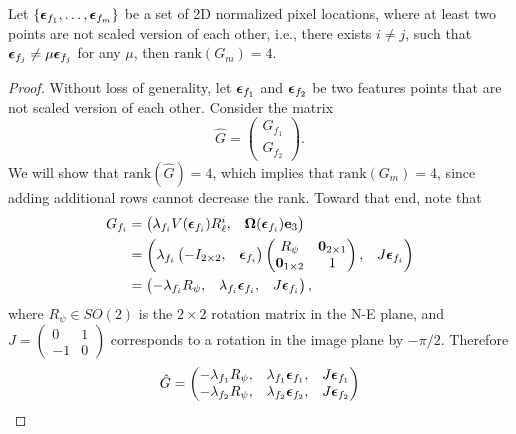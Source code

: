 \begin{lemma} \label{lem:G_rank_4}
	Let $\{\boldsymbol{\epsilon}_{f_1}, \dots, \boldsymbol{\epsilon}_{f_m}\}$ be a set of 2D normalized pixel locations, where at least two points are not scaled version of each other, i.e., there exists $i\neq j$, such that $\boldsymbol{\epsilon}_{f_j} \neq \mu\boldsymbol{\epsilon}_{f_j}$ for any $\mu$, then $\text{rank}(G_m)=4$.
\end{lemma}
\begin{proof}
	Without loss of generality, let $\boldsymbol{\epsilon}_{f_1}$ and $\boldsymbol{\epsilon}_{f_2}$ be two features points that are not scaled version of each other.  Consider the matrix 
	\[
	\hat{G} = \begin{pmatrix} G_{f_1} \\ G_{f_2} \end{pmatrix}.
	\]
	We will show that $\text{rank}(\hat{G})=4$, which implies that $\text{rank}(G_m)=4$, since adding additional rows cannot decrease the rank. 
	Toward that end, note that 
	\begin{align*}
	G_{f_i} &= \begin{pmatrix} \lambda_{f_i} V(\boldsymbol{\epsilon}_{f_i})R_\ell^i, & \boldsymbol{\Omega}(\boldsymbol{\epsilon}_{f_i})\mathbf{e}_3
			\end{pmatrix} \\
			&= \begin{pmatrix} \lambda_{f_i} \begin{pmatrix} -I_{2\times 2}, & \boldsymbol{\epsilon}_{f_i}\end{pmatrix}\begin{pmatrix} R_\psi & \mathbf{0}_{2\times 1} \\ \mathbf{0}_{1\times 2} & 1 \end{pmatrix}, & J\boldsymbol{\epsilon}_{f_i} \end{pmatrix}\\
			&= \begin{pmatrix} -\lambda_{f_i} R_\psi, & \lambda_{f_i} \boldsymbol{\epsilon}_{f_i}, & J\boldsymbol{\epsilon}_{f_i} \end{pmatrix},
	\end{align*}
	where $R_\psi\in SO(2)$ is the $2\times 2$ rotation matrix in the N-E plane, and $J=\begin{pmatrix} 0 & 1 \\ -1 & 0 \end{pmatrix}$ corresponds to a rotation in the image plane by $-\pi/2$.  
	Therefore
	\begin{align*}
	\hat{G} &= \begin{pmatrix} -\lambda_{f_1} R_\psi, & \lambda_{f_1} \epsilonbf_{f_1}, & J\epsilonbf_{f_1} \\ -\lambda_{f_2} R_\psi, & \lambda_{f_2} \epsilonbf_{f_2}, & J\epsilonbf_{f_2} \end{pmatrix} \\

\end{align*}
\end{proof}
